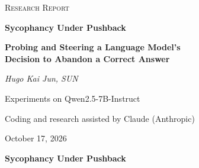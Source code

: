 \documentclass[12pt]{report}
\theoremstyle{definition}
\begin{document}
\begin{titlepage}
\centering
\vspace*{2.2cm}
{\Large \textsc{Research Report}\par}
\vspace{4.2cm}
{\LARGE \bfseries Sycophancy Under Pushback\par}
\vspace{0.4cm}
{\Large \bfseries Probing and Steering a Language Model's\\ Decision to Abandon a Correct Answer\par}
\vspace{2cm}
{\large \itshape Hugo Kai Jun, SUN\par}
\vfill
{\normalsize Experiments on Qwen2.5-7B-Instruct\par}
\vspace{0.5cm}
{\normalsize Coding and research assisted by Claude (Anthropic)\par}
\vspace{2.1cm}
{\large October 17, 2026\par}
\vspace*{1cm}
\end{titlepage}

\setcounter{page}{1}
\begin{center}
{\large \bfseries Sycophancy Under Pushback\par}
\end{center}
\end{document}
